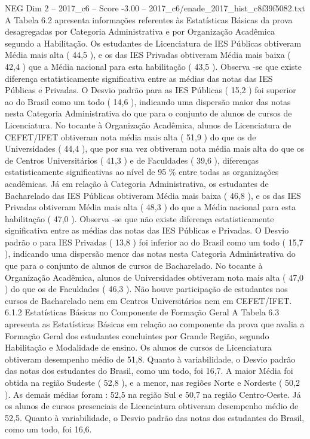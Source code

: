 \begin{textsample}{NEG Dim 2 – 2017\_c6 – Score -3.00 – 2017\_c6/enade\_2017\_hist\_c8f39f5082.txt}
A Tabela 6.2 apresenta informações referentes às Estatísticas Básicas da prova desagregadas por Categoria Administrativa e por Organização Acadêmica segundo a Habilitação.
Os estudantes de Licenciatura de IES Públicas obtiveram Média mais alta ( 44,5 ), e os das IES Privadas obtiveram Média mais baixa ( 42,4 ) que a Média nacional para esta habilitação ( 43,5 ).
Observa -se que existe diferença estatisticamente significativa entre as médias das notas das IES Públicas e Privadas.
O Desvio padrão para as IES Públicas ( 15,2 ) foi superior ao do Brasil como um todo ( 14,6 ), indicando uma dispersão maior das notas nesta Categoria Administrativa do que para o conjunto de alunos de cursos de Licenciatura.
No tocante à Organização Acadêmica, alunos de Licenciatura de CEFET/IFET obtiveram nota média mais alta ( 51,9 ) do que os de Universidades ( 44,4 ), que por sua vez obtiveram nota média mais alta do que os de Centros Universitários ( 41,3 ) e de Faculdades ( 39,6 ), diferenças estatisticamente significativas ao nível de 95 \% entre todas as organizações acadêmicas.
Já em relação à Categoria Administrativa, os estudantes de Bacharelado das IES Públicas obtiveram Média mais baixa ( 46,8 ), e os das IES Privadas obtiveram Média mais alta ( 48,3 ) do que a Média nacional para esta habilitação ( 47,0 ).
Observa -se que não existe diferença estatisticamente significativa entre as médias das notas das IES Públicas e Privadas.
O Desvio padrão o para IES Privadas ( 13,8 ) foi inferior ao do Brasil como um todo ( 15,7 ), indicando uma dispersão menor das notas nesta Categoria Administrativa do que para o conjunto de alunos de cursos de Bacharelado.
No tocante à Organização Acadêmica, alunos de Universidades obtiveram nota mais alta ( 47,0 ) do que os de Faculdades ( 46,3 ).
Não houve participação de estudantes nos cursos de Bacharelado nem em Centros Universitários nem em CEFET/IFET. 6.1.2 Estatísticas Básicas no Componente de Formação Geral A Tabela 6.3 apresenta as Estatísticas Básicas em relação ao componente da prova que avalia a Formação Geral dos estudantes concluintes por Grande Região, segundo Habilitação e Modalidade de ensino.
Os alunos de cursos de Licenciatura obtiveram desempenho médio de 51,8.
Quanto à variabilidade, o Desvio padrão das notas dos estudantes do Brasil, como um todo, foi 16,7.
A maior Média foi obtida na região Sudeste ( 52,8 ), e a menor, nas regiões Norte e Nordeste ( 50,2 ).
As demais médias foram : 52,5 na região Sul e 50,7 na região Centro-Oeste.
Já os alunos de cursos presenciais de Licenciatura obtiveram desempenho médio de 52,5.
Quanto à variabilidade, o Desvio padrão das notas dos estudantes do Brasil, como um todo, foi 16,6.

\end{textsample}
